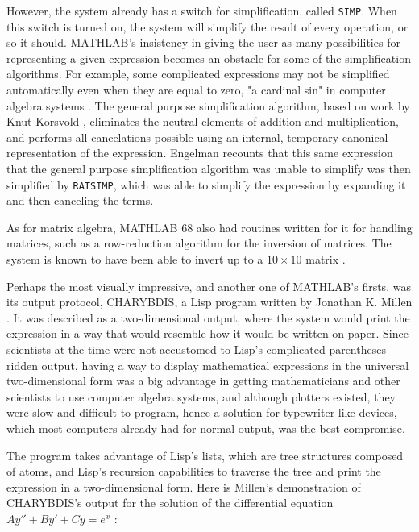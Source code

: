 However, the system already has a switch for simplification, called \verb|SIMP|. When this switch is turned on, the system will simplify the result of every operation, or so it should. MATHLAB's insistency in giving the user as many possibilities for representing a given expression becomes an obstacle for some of the simplification algorithms. For example, some complicated expressions may not be simplified automatically even when they are equal to zero, "a cardinal sin" in computer algebra systems \parencite{engelman1971legacy}. The general purpose simplification algorithm, based on work by Knut Korsvold \parencite*{korsvold1966line}, eliminates the neutral elements of addition and multiplication, and performs all cancelations possible using an internal, temporary canonical representation of the expression. Engelman recounts that this same expression that the general purpose simplification algorithm was unable to simplify was then simplified by \verb|RATSIMP|, which was able to simplify the expression by expanding it and then canceling the terms.

As for matrix algebra, MATHLAB 68 also had routines written for it for handling matrices, such as a row-reduction algorithm for the inversion of matrices. The system is known to have been able to invert up to a $10 \times 10$ matrix \parencite{engelman1971legacy}.

Perhaps the most visually impressive, and another one of MATHLAB's firsts, was its output protocol, CHARYBDIS, a Lisp program written by Jonathan K. Millen \parencite*{millen1967charybdis}. It was described as a two-dimensional output, where the system would print the expression in a way that would resemble how it would be written on paper. Since scientists at the time were not accustomed to Lisp's complicated parentheses-ridden output, having a way to display mathematical expressions in the universal two-dimensional form was a big advantage in getting mathematicians and other scientists to use computer algebra systems, and although plotters existed, they were slow and difficult to program, hence a solution for typewriter-like devices, which most computers already had for normal output, was the best compromise.

The program takes advantage of Lisp's lists, which are tree structures composed of atoms, and Lisp's recursion capabilities to traverse the tree and print the expression in a two-dimensional form. Here is Millen's demonstration of CHARYBDIS's output for the solution of the differential equation $Ay'' + By' + Cy = e^{x}$ \parencite*{millen1967charybdis}:

